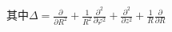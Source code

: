 \begin{solution}
\begin{enumerate}
\noindent 其中$\Delta = \frac{\partial}{\partial R^2} +
\frac{1}{R^2}\frac{\partial^2}{\partial\varphi^2}+
\frac{\partial^2}{\partial z^2}+
\frac{1}{R}\frac{\partial}{\partial R}$


\end{enumerate}
\end{solution}
